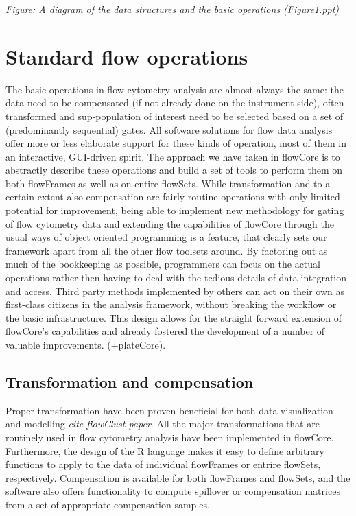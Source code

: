 \documentclass[12pt]{article}
\begin{document}
\textit{Figure: A diagram of the data structures and the basic
  operations (Figure1.ppt)}



\section{Standard flow operations}
The basic operations in flow cytometry analysis are almost always the
same: the data need to be compensated (if not already done on the
instrument side), often transformed and sup-population of interest
need to be selected based on a set of (predominantly sequential)
gates. All software solutions for flow data analysis offer more or
less elaborate support for these kinds of operation, most of them in
an interactive, GUI-driven spirit. The approach we have taken in
flowCore is to abstractly describe these operations and build a set of
tools to perform them on both flowFrames as well as on entire
flowSets. While transformation and to a certain extent also
compensation are fairly routine operations with only limited potential
for improvement, being able to implement new methodology for gating of
flow cytometry data and extending the capabilities of flowCore through
the usual ways of object oriented programming is a feature, that
clearly sets our framework apart from all the other flow toolsets
around. By factoring out as much of the bookkeeping as possible,
programmers can focus on the actual operations rather then having to
deal with the tedious details of data integration and access. Third
party methods implemented by others can act on their own as
first-class citizens in the analysis framework, without breaking the
workflow or the basic infrastructure. This design allows for the
straight forward extension of flowCore's capabilities and already
fostered the development of a number of valuable
improvements. \citep{lo2008agf} (+plateCore).




\subsection*{Transformation and compensation}
Proper transformation have been proven beneficial for both data
visualization and modelling \textit{cite flowClust paper}. All the
major transformations that are routinely used in flow cytometry
analysis have been implemented in flowCore. Furthermore, the design of
the R language makes it easy to define arbitrary functions to apply to
the data of individual flowFrames or entrire flowSets,
respectively. Compensation is available for both flowFrames and
flowSets, and the software also offers functionality to compute
spillover or compensation matrices from a set of appropriate
compensation samples. 
\end{document}
